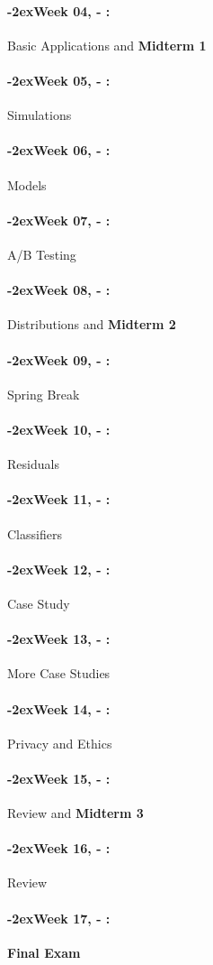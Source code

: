 \documentclass[11pt]{article}
\newcommand{\week}[1]{%
  \paragraph*{\kern-2ex\quad #1, \syldate{\today} - \AdvanceDate[4]\syldate{\today}:}%
  \ifdim\wd1=\wd\MONDAY
    \AdvanceDate[7]
  \else
    \AdvanceDate[7]
  \fi%
}
\begin{document}
\week{Week 04} Basic Applications and \textbf{Midterm 1}


\week{Week 05} Simulations


\week{Week 06} Models


\week{Week 07} A/B Testing


\week{Week 08} Distributions and \textbf{Midterm 2}


\week{Week 09} Spring Break

\week{Week 10} Residuals


\week{Week 11} Classifiers 


\week{Week 12} Case Study


\week{Week 13} More Case Studies

\week{Week 14} Privacy and Ethics


\week{Week 15} Review and \textbf{Midterm 3 }

\week{Week 16} Review

\week{Week 17} \textbf{Final Exam}
\end{document}
